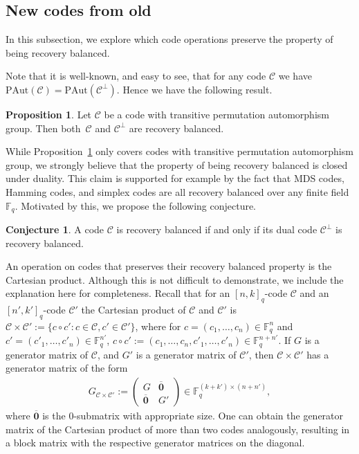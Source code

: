 \documentclass[11pt,a4paper,reqno,twoside]{amsart}
\theoremstyle{definition}
\newtheorem{proposition}{Proposition}
\newtheorem{conjecture}{Conjecture}
\newcommand{\F}{\mathbb{F}}
\newcommand{\mC}{\mathcal{C}}
\newcommand{\pcomment}[1]{{\color{purple}#1}}
\newcommand{\vcomment}[1]{{\color{violet}#1}}
\newcommand{\ey}[1]{{{\footnotesize [\pcomment{#1}\;\;\vcomment{--Eitan}]}}}
\begin{document}
\subsection{New codes from old}

In this subsection, we explore which code operations preserve the property of being recovery balanced.

Note that it is well-known, and easy to see, that for any code $\mC$ we have $\mbox{PAut}(\mC) = \mbox{PAut}(\mC^\perp)$. Hence we have the following result.

\begin{proposition} \label{prop:dualll}
    Let $\mC$ be a code with transitive permutation automorphism group. Then both~$\mC$ and $\mC^\perp$ are recovery balanced.
\end{proposition}

While Proposition~\ref{prop:dualll} only covers codes with transitive permutation automorphism group, we strongly believe that the property of being recovery balanced is closed under duality. This claim is supported for example by the fact that MDS codes, Hamming codes, and simplex codes are all recovery balanced over any finite field $\F_q$. Motivated by this, we propose the following conjecture.
\begin{conjecture} \label{conjecture}
A code $\mC$ is recovery balanced if and only if its  dual code $\mC^\perp$ is recovery balanced.
\end{conjecture}
An operation on codes that preserves their recovery balanced property is the Cartesian product. Although this is not difficult to demonstrate, we include the explanation here for completeness. Recall that for an $[n,k]_q$-code $\mC$ and an $[n',k']_q$-code $\mC'$ the Cartesian product of $\mC$ and $\mC'$ is  $\mC \times \mC':=\{c \circ c' : c \in \mC, c' \in \mC'\}$, where for $c=(c_1,\dots,c_n)\in \F_q^n$ and $c'=(c'_1,\dots,c'_n) \in \F_q^{n'}$, $c \circ c' := (c_1,\dots,c_n,c'_1,\dots,c'_n) \in \F_q^{n + n'}$. If $G$ is a generator matrix of $\mC$, and $G'$ is a generator matrix of $\mC'$, then $\mC \times \mC'$ has a generator matrix of the form
\begin{align*}
   G_{\mC\times\mC'} :=  \begin{pmatrix}
        G & \overline{\textbf{0}} \\
        \overline{\textbf{0}} & G'
    \end{pmatrix} \in \F_q^{(k+k') \times (n+n')},
\end{align*}
where $\overline{\textbf{0}}$ is the 0-submatrix with appropriate size. One can obtain the generator matrix of the Cartesian product of more than two codes analogously, resulting in a block matrix with the respective generator matrices on the diagonal. 
\end{document}

